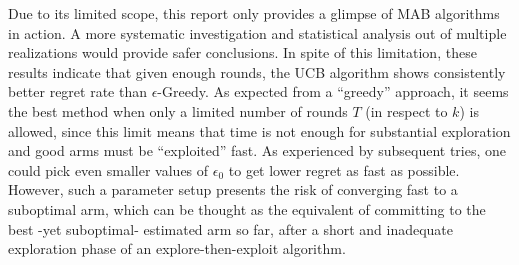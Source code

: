 Due to its limited scope, this report only provides a glimpse of MAB algorithms in action. A more systematic investigation and statistical analysis out of multiple realizations would provide safer conclusions. In spite of this limitation, these results indicate that given enough rounds, the UCB algorithm shows consistently better regret rate than $\epsilon$-Greedy. As expected from a ``greedy'' approach, it seems the best method when only a limited number of rounds $T$ (in respect to $k$) is allowed, since this limit means that time is not enough for substantial exploration and good arms must be ``exploited'' fast. As experienced by subsequent tries, one could pick even smaller values of $\epsilon_0$ to get lower regret as fast as possible. However, such a parameter setup presents the risk of converging fast to a suboptimal arm, which can be thought as the equivalent of committing to the best -yet suboptimal- estimated arm so far, after a short and inadequate exploration phase of an explore-then-exploit algorithm.